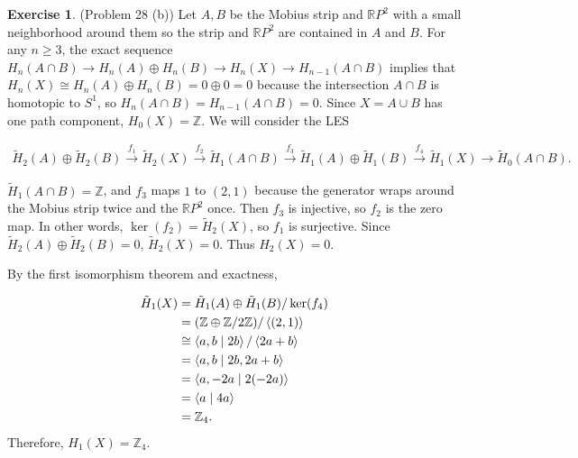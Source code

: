 \documentclass[psamsfonts]{amsart}
\theoremstyle{definition}
\newtheorem*{exer}{Exercise}
\theoremstyle{remark}
\numberwithin{equation}{section}
\begin{document}
\begin{exer}{(Problem 28 (b))}
  Let $A, B$ be the Mobius strip and $\mathbb{R}P^2$ with a small neighborhood around them so the strip and $\mathbb{R}P^2$ are contained in $A$ and $B$.
  For any $n \geq 3$, the exact sequence $H_n(A \cap B) \rightarrow H_n(A) \oplus H_n(B) \rightarrow H_n(X) \rightarrow H_{n - 1}(A \cap B)$ implies that $H_n(X) \cong H_n(A) \oplus H_n(B) = 0 \oplus 0 = 0$ because the intersection $A \cap B$ is homotopic to $S^1$, so $H_n(A \cap B) = H_{n - 1}(A \cap B) = 0$.
  Since $X = A \cup B$ has one path component, $H_0(X) = \mathbb{Z}$.
  We will consider the LES

  \begin{align*}
    \tilde{H}_2(A) \oplus \tilde{H}_2(B) \xrightarrow{f_1} \tilde{H}_2(X) 
    \xrightarrow{f_2} \tilde{H}_1(A \cap B) \xrightarrow{f_3} \tilde{H}_1(A) \oplus \tilde{H}_1(B) \xrightarrow{f_4} \tilde{H}_1(X) 
    \rightarrow \tilde{H}_0(A \cap B).
  \end{align*}

  $\tilde{H}_1(A \cap B) = \mathbb{Z}$, and $f_3$ maps $1$ to $(2, 1)$ because the generator wraps around the Mobius strip twice and the $\mathbb{R}P^2$ once.
  Then $f_3$ is injective, so $f_2$ is the zero map.
  In other words, $\ker(f_2) = \tilde{H}_2(X)$, so $f_1$ is surjective.
  Since $\tilde{H}_2(A) \oplus \tilde{H}_2(B) = 0$, $\tilde{H}_2(X) = 0$.
  Thus $H_2(X) = 0$.

  By the first isomorphism theorem and exactness,

  \begin{align*}
    \tilde{H}_1(X)
      &= \tilde{H}_1(A) \oplus \tilde{H}_1(B) / \ker(f_4) \\
      &= (\mathbb{Z} \oplus \mathbb{Z}/2\mathbb{Z}) / \ev{(2, 1)} \\
      &\cong \ev{a, b \mid 2b}  / \ev{2a + b} \\
      &= \ev{a, b \mid 2b, 2a + b} \\
      &= \ev{a, -2a \mid 2(-2a)} \\
      &= \ev{a \mid 4a} \\
      &= \mathbb{Z}_4.
  \end{align*}
  Therefore, $H_1(X) = \mathbb{Z}_4$.
\end{exer}
\end{document}
